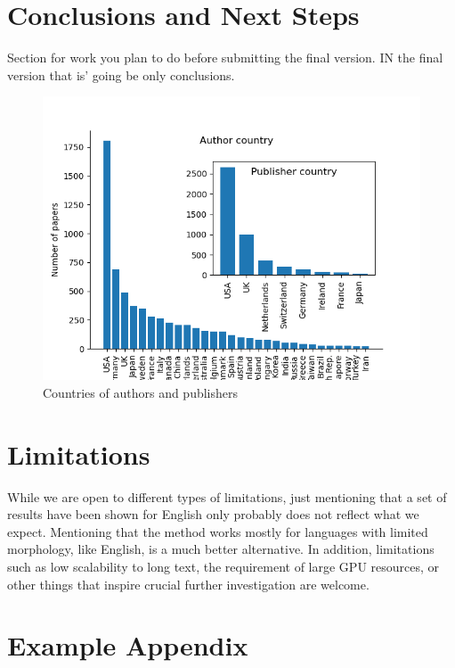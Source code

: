 \documentclass[11pt]{article}
\begin{document}
\section{Conclusions and Next Steps}
Section for work you plan to do before submitting the final version. IN the final version that is' going be only conclusions.
\begin{figure}
	\includegraphics[width= \columnwidth]{./Images/Countries.png}
	\caption{Countries of authors and publishers}
	\label{fig:countries}
\end{figure}

\section*{Limitations}
While we are open to different types of limitations, just mentioning that a set of results have been shown for English only probably does not reflect what we expect. 
Mentioning that the method works mostly for languages with limited morphology, like English, is a much better alternative.
In addition, limitations such as low scalability to long text, the requirement of large GPU resources, or other things that inspire crucial further investigation are welcome.




\appendix

\section{Example Appendix}
\label{sec:appendix}
\end{document}
